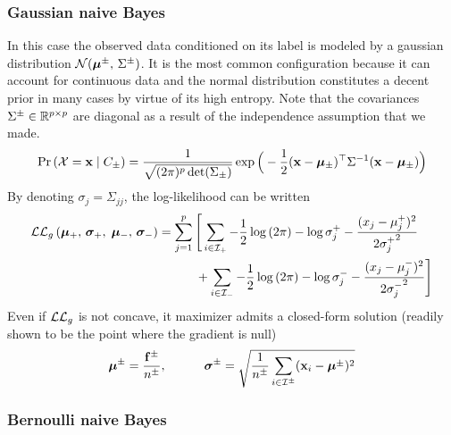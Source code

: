 \subsubsection{Gaussian naive Bayes}\label{subsubsec:gnb}

In this case the observed data conditioned on its label is modeled by a gaussian distribution
$\mathcal{N}( \bm{\mu}^\pm,\, \Sigma^\pm )$.
It is the most common configuration because it can account for continuous data and the normal distribution constitutes
a decent prior in many cases by virtue of its high entropy.
Note that the covariances $\Sigma^\pm \in \mathbb{R}^{p \times p}$
are diagonal as a result of the independence assumption that we made.
\begin{equation*}
    \Pr\left( \mathcal{X} = \mathbf{x} \mid C_\pm \right) =
    \frac{1}{\sqrt{(2\pi)^p\det(\Sigma_\pm)}}
    \exp\Big( -\frac{1}{2}(\mathbf{x} - \bm{\mu}_\pm)^\top\Sigma^{-1}(\mathbf{x} - \bm{\mu}_\pm) \Big)
\end{equation*}
By denoting $\sigma_j = \Sigma_{j j}$, the log-likelihood can be written
\begin{equation*}
    \begin{split}
        \mathcal{L}\mathcal{L}_g\left( \bm{\mu}_+,\, \bm{\sigma}_+,\; \bm{\mu}_-,\, \bm{\sigma}_-\right ) &=
        \sum_{j = 1}^p \Bigg[
            \sum_{i \in \mathcal{I}_+}
            -\frac{1}{2} \log \left( 2\pi \right)
            -\log \sigma_j^+
            -\frac{(x_j - \mu^+_j)^2}{2{\sigma^+_j}^2}\\
            &\qquad\quad+ \sum_{i \in \mathcal{I}_-}
            -\frac{1}{2} \log \left( 2\pi \right)
            -\log \sigma_j^-
            -\frac{(x_j - \mu^-_j)^2}{2{\sigma^-_j}^2}
            \Bigg]
    \end{split}
\end{equation*}
Even if $\mathcal{L}\mathcal{L}_g$ is not concave, it maximizer admits a closed-form solution
(readily shown to be the point where the gradient is null)
\begin{align*}
    \bm{\mu}^\pm = \frac{\mathbf{f}^\pm}{n^\pm}
    ,\qquad\quad
    \bm{\sigma}^\pm = \sqrt{\frac{1}{n^\pm} \sum_{i \in \mathcal{I}^\pm} (\mathbf{x}_i - \bm{\mu}^\pm)^2}
\end{align*}

\subsubsection{Bernoulli naive Bayes}\label{subsubsec:bnb}

